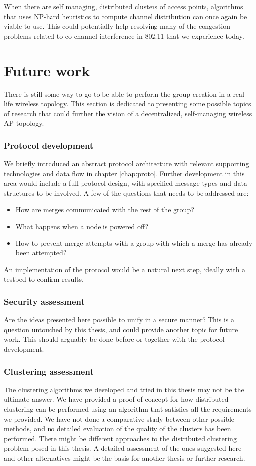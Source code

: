 When there are self managing, distributed clusters of access points, algorithms that uses NP-hard heuristics to compute channel distribution can once again be viable to use. This could
potentially help resolving many of the congestion problems related to co-channel interference in 802.11 that we experience today.

\section{Future work}
There is still some way to go to be able to perform the group creation in a real-life wireless topology. This section is dedicated to presenting some possible topics of research
that could further the vision of a decentralized, self-managing wireless AP topology. 

\subsubsection{Protocol development}
We briefly introduced an abstract protocol architecture with relevant supporting technologies and data flow in chapter \ref{chap:proto}. Further development in this area would include a full protocol design, with
specified message types and data structures to be involved. A few of the questions that needs to be addressed are: 
\begin{itemize}
	\item How are merges communicated with the rest of the group?
	\item What happens when a node is powered off?
	\item How to prevent merge attempts with a group with which a merge has already been attempted?
\end{itemize}

An implementation of the protocol would be a natural next step, ideally with a testbed to confirm results. 

\subsubsection{Security assessment}
Are the ideas presented here possible to unify in a secure manner? This is a question untouched by this thesis, and could provide another topic for future work. This should arguably 
be done before or together with the protocol development. 

\subsubsection{Clustering assessment}
The clustering algorithms we developed and tried in this thesis may not be the ultimate answer. We have provided a proof-of-concept for how distributed clustering can be performed using
an algorithm that satisfies all the requirements we provided. We have not done a comparative study between other possible methods, and no detailed evaluation of the quality of the clusters has been performed. There might be different approaches to the distributed clustering problem posed in this thesis. A detailed assessment of the ones suggested here and other alternatives might be the basis for another thesis or further research.


